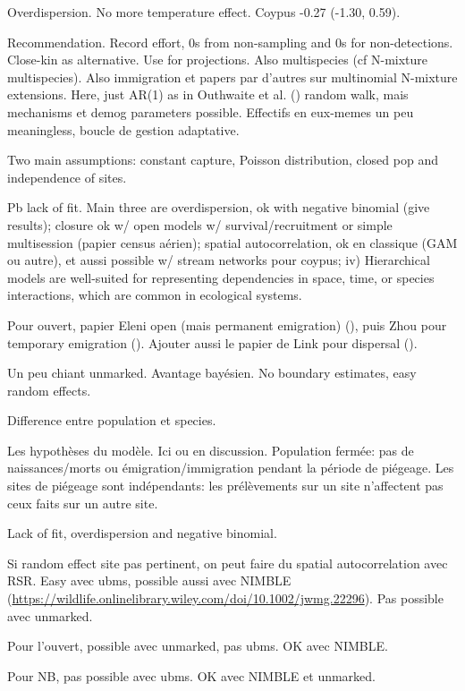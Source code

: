 \documentclass[
  11pt,
  a4paper,
]{article}
\begin{document}
Overdispersion. No more temperature effect. Coypus -0.27 (-1.30, 0.59).

Recommendation. Record effort, 0s from non-sampling and 0s for non-detections. Close-kin as alternative. Use for projections. Also multispecies (cf N-mixture multispecies). Also immigration et papers par d'autres sur multinomial N-mixture extensions. Here, just AR(1) as in Outhwaite et al. () random walk, mais mechanisms et demog parameters possible. Effectifs en eux-memes un peu meaningless, boucle de gestion adaptative.

Two main assumptions: constant capture, Poisson distribution, closed pop and independence of sites.

Pb lack of fit. Main three are overdispersion, ok with negative binomial (give results); closure ok w/ open models w/ survival/recruitment or simple multisession (papier census aérien); spatial autocorrelation, ok en classique (GAM ou autre), et aussi possible w/ stream networks pour coypus; iv) Hierarchical models are well-suited for representing dependencies in space, time, or species interactions, which are common in ecological systems.

Pour ouvert, papier Eleni open (mais permanent emigration) (), puis Zhou pour temporary emigration (). Ajouter aussi le papier de Link pour dispersal ().

Un peu chiant unmarked. Avantage bayésien. No boundary estimates, easy random effects.

Difference entre population et species.

Les hypothèses du modèle. Ici ou en discussion. Population fermée: pas de naissances/morts ou émigration/immigration pendant la période de piégeage. Les sites de piégeage sont indépendants: les prélèvements sur un site n'affectent pas ceux faits sur un autre site.

Lack of fit, overdispersion and negative binomial.

Si random effect site pas pertinent, on peut faire du spatial autocorrelation avec RSR. Easy avec ubms, possible aussi avec NIMBLE (\url{https://wildlife.onlinelibrary.wiley.com/doi/10.1002/jwmg.22296}). Pas possible avec unmarked.

Pour l'ouvert, possible avec unmarked, pas ubms. OK avec NIMBLE.

Pour NB, pas possible avec ubms. OK avec NIMBLE et unmarked.
\end{document}
